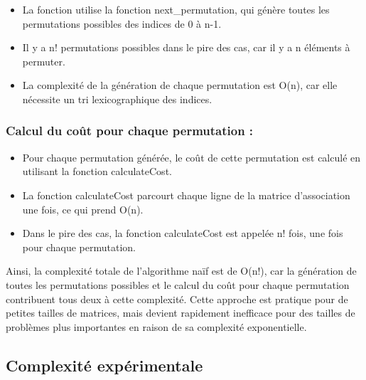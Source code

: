 \documentclass[
]{article}
\providecommand{\tightlist}{%
  \setlength{\itemsep}{0pt}\setlength{\parskip}{0pt}}
\begin{document}
\begin{itemize}
\tightlist
\item
  La fonction utilise la fonction next\_permutation, qui génère toutes
  les permutations possibles des indices de 0 à n-1.
\item
  Il y a n! permutations possibles dans le pire des cas, car il y a n
  éléments à permuter.
\item
  La complexité de la génération de chaque permutation est O(n), car
  elle nécessite un tri lexicographique des indices.
\end{itemize}

\hypertarget{calcul-du-couxfbt-pour-chaque-permutation}{%
\subsubsection{Calcul du coût pour chaque permutation
:}\label{calcul-du-couxfbt-pour-chaque-permutation}}

\begin{itemize}
\tightlist
\item
  Pour chaque permutation générée, le coût de cette permutation est
  calculé en utilisant la fonction calculateCost.
\item
  La fonction calculateCost parcourt chaque ligne de la matrice
  d'association une fois, ce qui prend O(n).
\item
  Dans le pire des cas, la fonction calculateCost est appelée n! fois,
  une fois pour chaque permutation.
\end{itemize}

Ainsi, la complexité totale de l'algorithme naïf est de O(n!), car la
génération de toutes les permutations possibles et le calcul du coût
pour chaque permutation contribuent tous deux à cette complexité. Cette
approche est pratique pour de petites tailles de matrices, mais devient
rapidement inefficace pour des tailles de problèmes plus importantes en
raison de sa complexité exponentielle.

\hypertarget{complexituxe9-expuxe9rimentale}{%
\subsection{Complexité
expérimentale}\label{complexituxe9-expuxe9rimentale}}
\end{document}
